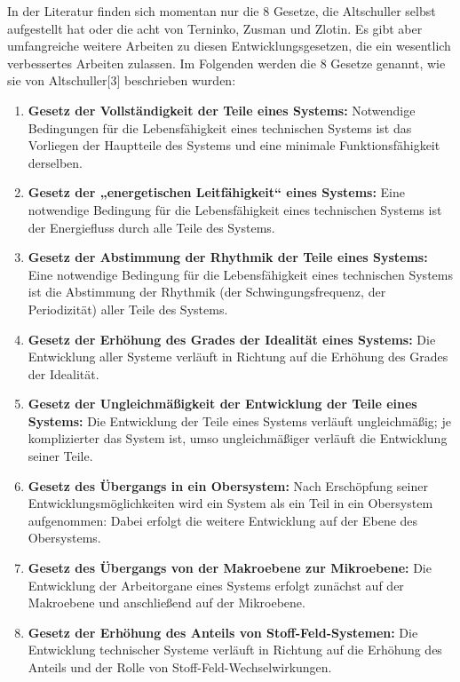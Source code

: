 \documentclass[11pt,a4paper]{article}
\begin{document}
In der Literatur finden sich momentan nur die 8 Gesetze, die Altschuller
selbst aufgestellt hat oder die acht von Terninko, Zusman und Zlotin. Es gibt
aber umfangreiche weitere Arbeiten zu diesen Entwicklungsgesetzen, die ein
wesentlich verbessertes Arbeiten zulassen. Im Folgenden werden die 8 Gesetze
genannt, wie sie von Altschuller[3] beschrieben wurden:
\begin{enumerate}
\item \textbf{Gesetz der Vollständigkeit der Teile eines Systems:} Notwendige
  Bedingungen für die Lebensfähigkeit eines technischen Systems ist das
  Vorliegen der Hauptteile des Systems und eine minimale Funktionsfähigkeit
  derselben.
\item \textbf{Gesetz der „energetischen Leitfähigkeit“ eines Systems:} Eine
  notwendige Bedin\-gung für die Lebensfähigkeit eines technischen Systems ist
  der Energiefluss durch alle Teile des Systems.
\item \textbf{Gesetz der Abstimmung der Rhythmik der Teile eines Systems:}
  Eine notwen\-dige Bedingung für die Lebensfähigkeit eines technischen
  Systems ist die Abstimmung der Rhythmik (der Schwingungsfrequenz, der
  Periodizität) aller Teile des Systems.
\item \textbf{Gesetz der Erhöhung des Grades der Idealität eines Systems:} Die
  Entwicklung aller Systeme verläuft in Richtung auf die Erhöhung des Grades
  der Idealität.
\item \textbf{Gesetz der Ungleichmäßigkeit der Entwicklung der Teile eines
  Systems:} Die Entwicklung der Teile eines Systems verläuft ungleichmäßig; je
  komplizierter das System ist, umso ungleichmäßiger verläuft die Entwicklung
  seiner Teile.
\item \textbf{Gesetz des Übergangs in ein Obersystem:} Nach Erschöpfung seiner
  Entwicklungs\-möglichkeiten wird ein System als ein Teil in ein Obersystem
  aufgenommen: Dabei erfolgt die weitere Entwicklung auf der Ebene des
  Obersystems.
\item \textbf{Gesetz des Übergangs von der Makroebene zur Mikroebene:} Die
  Entwicklung der Arbeitorgane eines Systems erfolgt zunächst auf der
  Makroebene und anschließend auf der Mikroebene.
\item \textbf{Gesetz der Erhöhung des Anteils von Stoff-Feld-Systemen:} Die
  Entwicklung technischer Systeme verläuft in Richtung auf die Erhöhung des
  Anteils und der Rolle von Stoff-Feld-Wechselwirkungen.
\end{enumerate}
\end{document}
